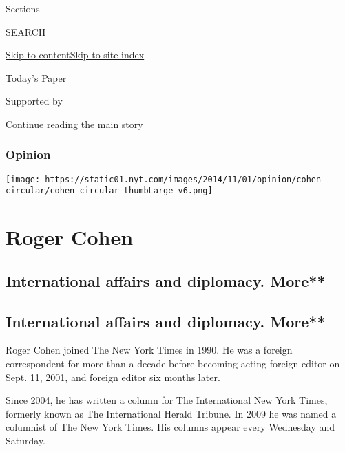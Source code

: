 Sections

SEARCH

\protect\hyperlink{site-content}{Skip to
content}\protect\hyperlink{site-index}{Skip to site index}

\href{https://myaccount.nytimes.com/auth/login?response_type=cookie\&client_id=vi}{}

\href{https://www.nytimes.com/section/todayspaper}{Today's Paper}

Supported by

\protect\hyperlink{after-sponsor}{Continue reading the main story}

\hypertarget{opinion}{%
\subsubsection{\texorpdfstring{\href{/section/opinion}{Opinion}}{Opinion}}\label{opinion}}

\texttt{[image: https://static01.nyt.com/images/2014/11/01/opinion/cohen-circular/cohen-circular-thumbLarge-v6.png]}

\hypertarget{roger-cohen}{%
\section{Roger Cohen}\label{roger-cohen}}

\hypertarget{international-affairs-and-diplomacy-more}{%
\subsection{International affairs and diplomacy.
More**}\label{international-affairs-and-diplomacy-more}}

\hypertarget{international-affairs-and-diplomacy-more-1}{%
\subsection{International affairs and diplomacy.
More**}\label{international-affairs-and-diplomacy-more-1}}

Roger Cohen joined The New York Times in 1990. He was a foreign
correspondent for more than a decade before becoming acting foreign
editor on Sept. 11, 2001, and foreign editor six months later.

Since 2004, he has written a column for The International New York
Times, formerly known as The International Herald Tribune. In 2009 he
was named a columnist of The New York Times. His columns appear every
Wednesday and Saturday.

